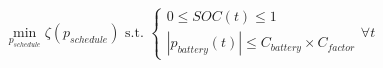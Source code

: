\begin{equation}
	\min_{p_{schedule}}\zeta(p_{schedule}) \text{ s.t. }
	\begin{cases}
		0 \leq SOC(t) \leq 1\\
		|p_{battery}(t)| \leq C_{battery} \times C_{factor}
	\end{cases}
	\forall t
	\label{ch2:equ:cost-minimisation}
\end{equation}